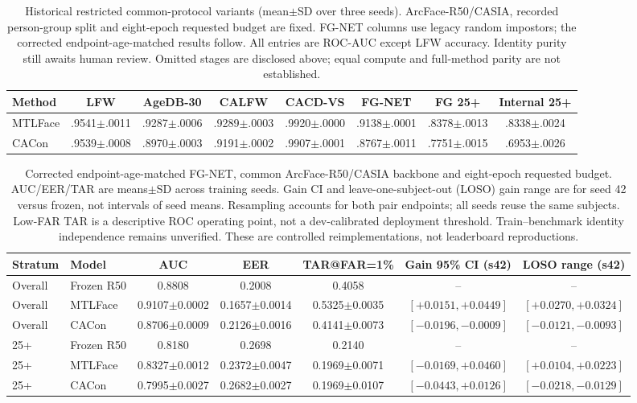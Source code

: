 \documentclass[journal]{IEEEtran}
\begin{document}
\begin{table}[!t]
\caption{Historical restricted common-protocol variants (mean$\pm$SD over three seeds).
ArcFace-R50/CASIA, recorded person-group split and eight-epoch requested budget are fixed.
FG-NET columns use legacy random impostors; the corrected endpoint-age-matched results follow.
All entries are ROC-AUC except LFW accuracy. Identity purity still awaits human review.
Omitted stages are disclosed above; equal compute and full-method parity are not established.}
\label{tab:controlled-sota}
\centering
\footnotesize
\begin{tabular}{@{}lccccccc@{}}
\toprule
Method & LFW & AgeDB-30 & CALFW & CACD-VS & FG-NET & FG 25+ & Internal 25+ \\
\midrule
MTLFace & .9541$\pm$.0011 & .9287$\pm$.0006 & .9289$\pm$.0003 & .9920$\pm$.0000 & .9138$\pm$.0001 & .8378$\pm$.0013 & .8338$\pm$.0024 \\
CACon & .9539$\pm$.0008 & .8970$\pm$.0003 & .9191$\pm$.0002 & .9907$\pm$.0001 & .8767$\pm$.0011 & .7751$\pm$.0015 & .6953$\pm$.0026 \\
\bottomrule
\end{tabular}
\end{table}

\begin{table}[!t]
\caption{Corrected endpoint-age-matched FG-NET, common ArcFace-R50/CASIA backbone and eight-epoch requested budget. AUC/EER/TAR are means$\pm$SD across training seeds. Gain CI and leave-one-subject-out (LOSO) gain range are for seed 42 versus frozen, not intervals of seed means. Resampling accounts for both pair endpoints; all seeds reuse the same subjects. Low-FAR TAR is a descriptive ROC operating point, not a dev-calibrated deployment threshold. Train--benchmark identity independence remains unverified. These are controlled reimplementations, not leaderboard reproductions.}
\label{tab:fgnet-comparators}
\centering\footnotesize
\begin{tabular}{@{}llccccc@{}}
\toprule
Stratum & Model & AUC & EER & TAR@FAR=1\% & Gain 95\% CI (s42) & LOSO range (s42) \\
\midrule
Overall & Frozen R50 & 0.8808 & 0.2008 & 0.4058 & -- & -- \\
Overall & MTLFace & 0.9107$\pm$0.0002 & 0.1657$\pm$0.0014 & 0.5325$\pm$0.0035 & $[+0.0151,+0.0449]$ & $[+0.0270,+0.0324]$ \\
Overall & CACon & 0.8706$\pm$0.0009 & 0.2126$\pm$0.0016 & 0.4141$\pm$0.0073 & $[-0.0196,-0.0009]$ & $[-0.0121,-0.0093]$ \\
25+ & Frozen R50 & 0.8180 & 0.2698 & 0.2140 & -- & -- \\
25+ & MTLFace & 0.8327$\pm$0.0012 & 0.2372$\pm$0.0047 & 0.1969$\pm$0.0071 & $[-0.0169,+0.0460]$ & $[+0.0104,+0.0223]$ \\
25+ & CACon & 0.7995$\pm$0.0027 & 0.2682$\pm$0.0027 & 0.1969$\pm$0.0107 & $[-0.0443,+0.0126]$ & $[-0.0218,-0.0129]$ \\
\bottomrule
\end{tabular}
\end{table}
\end{document}
